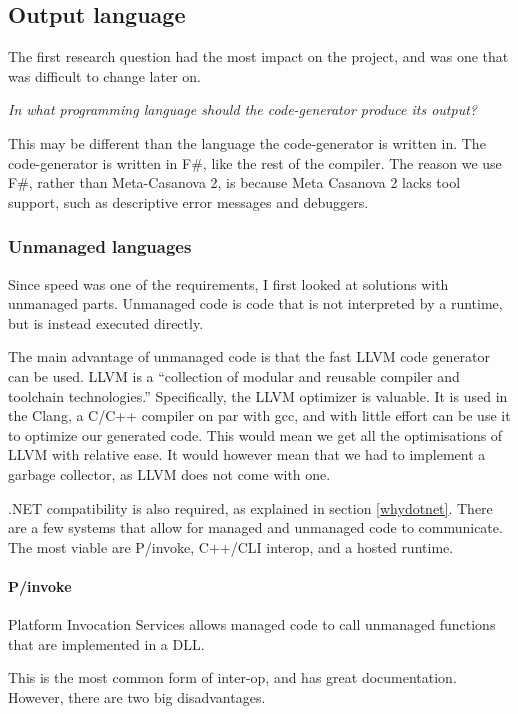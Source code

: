 \subsection{Output language}
The first research question had the most impact on the project, and was one that was difficult to change later on.

\textit{In what programming language should the code-generator produce its output?}

This may be different than the language the code-generator is written in.
The code-generator is written in F\#, like the rest of the compiler.
The reason we use F\#, rather than Meta-Casanova 2, is because Meta Casanova 2 lacks tool support, such as descriptive error messages and debuggers.

\subsubsection{Unmanaged languages}
Since speed was one of the requirements, I first looked at solutions with unmanaged parts.
Unmanaged code is code that is not interpreted by a runtime, but is instead executed directly.

The main advantage of unmanaged code is that the fast LLVM code generator can be used.
LLVM is a ``collection of modular and reusable compiler and toolchain technologies.''\cite{llvm}
Specifically, the LLVM optimizer is valuable.
It is used in the Clang, a C/C++ compiler on par with gcc, and with little effort can be use it to optimize our generated code.
This would mean we get all the optimisations of LLVM with relative ease.
It would however mean that we had to implement a garbage collector, as LLVM does not come with one.
 
.NET compatibility is also required, as explained in section \ref{whydotnet}.
There are a few systems that allow for managed and unmanaged code to communicate.
The most viable are P/invoke, C++/CLI interop, and a hosted runtime.

\paragraph{P/invoke}
Platform Invocation Services allows managed code to call unmanaged functions that are implemented in a DLL.\cite{msdn_pinvoke}

This is the most common form of inter-op, and has great documentation.
However, there are two big disadvantages.

